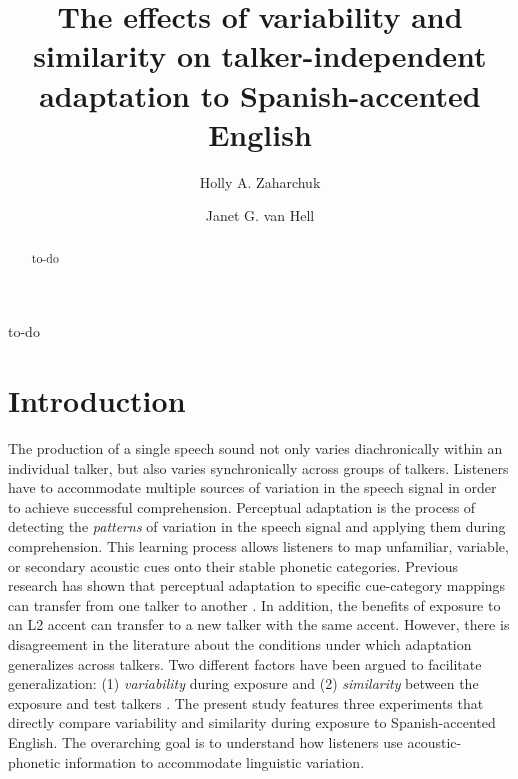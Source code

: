 \documentclass[preprint, 3p, authoryear]{elsarticle} %
\begin{document}
\begin{frontmatter}

  \title{The effects of variability and similarity on talker-independent adaptation to Spanish-accented English}
    \author[a,b]{Holly A. Zaharchuk%
  }
    \author[a]{Janet G. van Hell%
  }
  
  
  \begin{abstract}
  to-do
  \end{abstract}
    \begin{keyword}
    
    to-do
  \end{keyword}
  
 \end{frontmatter}

\hypertarget{introduction}{%
\section{Introduction}\label{introduction}}

The production of a single speech sound not only varies diachronically within an individual talker, but also varies synchronically across groups of talkers.
Listeners have to accommodate multiple sources of variation in the speech signal in order to achieve successful comprehension.
Perceptual adaptation is the process of detecting the \emph{patterns} of variation in the speech signal and applying them during comprehension.
This learning process allows listeners to map unfamiliar, variable, or secondary acoustic cues onto their stable phonetic categories.
Previous research has shown that perceptual adaptation to specific cue-category mappings can transfer from one talker to another \citep[e.g.,][]{kraljic2006, kraljic2007, reinisch2014}.
In addition, the benefits of exposure to an L2 accent can transfer to a new talker with the same accent.
However, there is disagreement in the literature about the conditions under which adaptation generalizes across talkers.
Two different factors have been argued to facilitate generalization: (1) \emph{variability} during exposure \citep{baese2013, bradlow2008} and (2) \emph{similarity} between the exposure and test talkers \citep{xie2017similarity, xie2021}.
The present study features three experiments that directly compare variability and similarity during exposure to Spanish-accented English.
The overarching goal is to understand how listeners use acoustic-phonetic information to accommodate linguistic variation.
\end{document}
